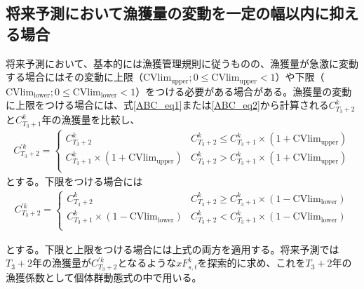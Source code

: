 \documentclass[11pt]{jsarticle}
\begin{document}
\subsection{将来予測において漁獲量の変動を一定の幅以内に抑える場合\label{CVupper}}
将来予測において、基本的には漁獲管理規則に従うものの、漁獲量が急激に変動する場合にはその変動に上限（$\mathrm{CVlim}_\mathrm{upper}; 0 \leq \mathrm{CVlim}_\mathrm{upper} < 1$）や下限（$\mathrm{CVlim}_\mathrm{lower}; 0 \leq \mathrm{CVlim}_\mathrm{lower} < 1$）をつける必要がある場合がある\cite{ichinokawa2022}。漁獲量の変動に上限をつける場合には、式\ref{ABC_eq1}または\ref{ABC_eq2}から計算される$C_{T_3+2}^k$と$C_{T_3+1}^k$年の漁獲量を比較し、
\begin{eqnarray}
  C_{T_3+2}^{'k} =
  \begin{cases}
    C_{T_3+2}^{k} & C_{T_3+2}^{k}  \le C_{T_3+1}^{k} \times (1+\mathrm{CVlim}_\mathrm{upper}) \\
    C_{T_3+1}^k \times (1+\mathrm{CVlim}_\mathrm{upper}) & C_{T_3+2}^k  > C_{T_3+1}^k \times (1+\mathrm{CVlim}_\mathrm{upper}) \\
  \end{cases}
\end{eqnarray}
とする。下限をつける場合には
\begin{eqnarray}
  C_{T_3+2}^{'k} =
  \begin{cases}
    C_{T_3+2}^k & C_{T_3+2}^k  \ge C_{T_3+1}^k \times (1-\mathrm{CVlim}_\mathrm{lower}) \\
    C_{T_3+1}^k \times (1-\mathrm{CVlim}_\mathrm{lower}) & C_{T_3+2}^k  < C_{T_3+1}^k \times (1-\mathrm{CVlim}_\mathrm{lower}) \\
  \end{cases}
\end{eqnarray}

とする。下限と上限をつける場合には上式の両方を適用する。将来予測では$T_3+2$年の漁獲量が$C_{T_3+2}^{'k}$となるような$xF_{s,t}^k$を探索的に求め、これを$T_3+2$年の漁獲係数として個体群動態式の中で用いる。
\end{document}
